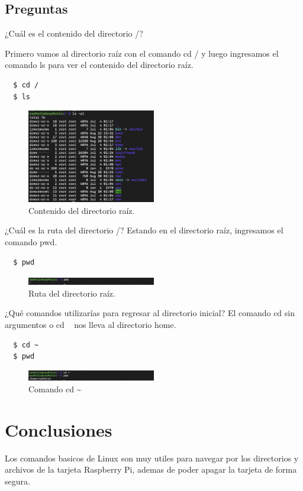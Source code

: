 \documentclass[12pt]{report}
\begin{document}
\section{Preguntas}
¿Cuál es el contenido del directorio /?

Primero vamos al directorio raíz con el comando cd / y luego ingresamos el comando ls para ver el contenido del directorio raíz.
\begin{verbatim}
  $ cd /
  $ ls
\end{verbatim}
\begin{figure}[H]
  \centering
  \includegraphics[width=0.5\textwidth]{Screenshots/contenidoRaiz.png}
  \caption{Contenido del directorio raíz.}
  \label{fig:raiz}
\end{figure}

¿Cuál es la ruta del directorio /?
Estando en el directorio raíz, ingresamos el comando pwd.
\begin{verbatim}
  $ pwd
\end{verbatim}
\begin{figure}[H]
  \centering
  \includegraphics[width=0.5\textwidth]{Screenshots/rutaRaiz.png}
  \caption{Ruta del directorio raíz.}
  \label{fig:pwdRaiz}
\end{figure}

¿Qué comandos utilizarías para regresar al directorio inicial?
El comando cd sin argumentos o cd ~ nos lleva al directorio home.
\begin{verbatim}
  $ cd ~
  $ pwd
\end{verbatim}
\begin{figure}[H]
  \centering
  \includegraphics[width=0.5\textwidth]{Screenshots/regrsoHome.png}
  \caption{Comando cd \~~}
  \label{fig:cdHome}
\end{figure}
\newpage

\chapter{Conclusiones}
Los comandos basicos de Linux son muy utiles para navegar por los directorios y archivos de la tarjeta Raspberry Pi, ademas de poder apagar la tarjeta de forma segura.
\newpage
\end{document}
